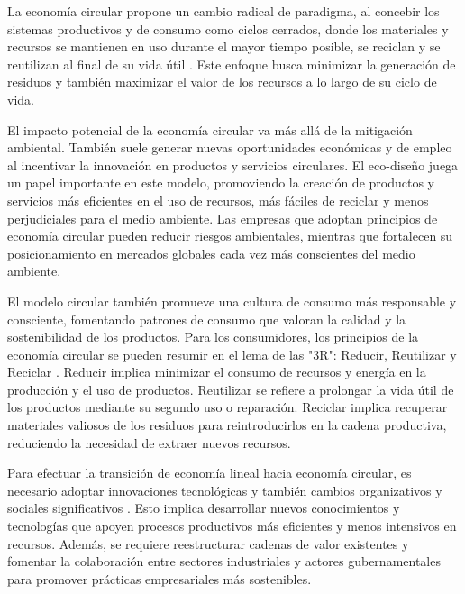 \documentclass[main.tex]{subfiles}
\begin{document}
La economía circular propone un cambio radical de paradigma, al concebir los sistemas productivos y de consumo como ciclos cerrados, donde los materiales y recursos se mantienen en uso durante el mayor tiempo posible, se reciclan y se reutilizan al final de su vida útil \cite{circular2017economia}. Este enfoque busca minimizar la generación de residuos y también maximizar el valor de los recursos a lo largo de su ciclo de vida.


El impacto potencial de la economía circular va más allá de la mitigación ambiental. También suele generar nuevas oportunidades económicas y de empleo al incentivar la innovación en productos y servicios circulares. El eco-diseño juega un papel importante en este modelo, promoviendo la creación de productos y servicios más eficientes en el uso de recursos, más fáciles de reciclar y menos perjudiciales para el medio ambiente. Las empresas que adoptan principios de economía circular pueden reducir riesgos ambientales, mientras que fortalecen su posicionamiento en mercados globales cada vez más conscientes del medio ambiente.

El modelo circular también promueve una cultura de consumo más responsable y consciente, fomentando patrones de consumo que valoran la calidad y la sostenibilidad de los productos. Para los consumidores, los principios de la economía circular se pueden resumir en el lema de las "3R": Reducir, Reutilizar y Reciclar \cite{cerda2016economia}. Reducir implica minimizar el consumo de recursos y energía en la producción y el uso de productos. Reutilizar se refiere a prolongar la vida útil de los productos mediante su segundo uso o reparación. Reciclar implica recuperar materiales valiosos de los residuos para reintroducirlos en la cadena productiva, reduciendo la necesidad de extraer nuevos recursos.

Para efectuar la transición de economía lineal hacia economía circular, es necesario adoptar innovaciones tecnológicas y también cambios organizativos y sociales significativos \cite{espanacircular2030}. Esto implica desarrollar nuevos conocimientos y tecnologías que apoyen procesos productivos más eficientes y menos intensivos en recursos. Además, se requiere reestructurar cadenas de valor existentes y fomentar la colaboración entre sectores industriales y actores gubernamentales para promover prácticas empresariales más sostenibles.
\end{document}
